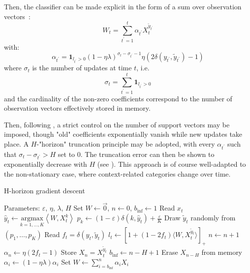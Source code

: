 \documentclass[preprint,12pt,authoryear]{elsarticle}
\begin{document}
Then, the classifier can be made explicit in the form of a sum over observation vectors~:
$$W_t = \sum_{t^\prime=1}^t \alpha_{t^\prime} X_t^{\tilde{y}_{t^\prime}}$$
with:
$$\alpha_{t^\prime} = \mathbf{1}_{l_{t^\prime} > 0}(1 - \eta \lambda)^{\sigma_t - \sigma_{t^\prime}-1}  \eta (2\delta(y_{t^\prime},\tilde{y}_{t^\prime})-1)$$
where $\sigma_t$ is the number of updates at time $t$, i.e.
$$\sigma_t = \sum_{t^\prime=1}^t \mathbf{1}_{l_{t^\prime} > 0}$$  
and the cardinality of the non-zero coefficients correspond to the number of observation vectors effectively stored in memory.

Then, following \cite{kivinen2004online}, a strict control on the number of support  vectors may be imposed, though "old" coefficients exponentially vanish while new updates take place. A $H$-"horizon" truncation principle may be adopted, with every $\alpha_{t^\prime}$ such that $\sigma_t - \sigma_{t^\prime} > H$ set to 0. The truncation error can then be shown to  exponentially decrease with $H$ (see \cite{kivinen2004online}). This approach is of course well-adapted to the non-stationary case, where context-related categories change over time.

\begin{algorithm}[t!]
	\caption{H-horizon gradient descent}
	\begin{algorithmic}
		
		\STATE Parameters:  $\varepsilon$, $\eta$, $\lambda$, $H$
		\STATE Set $W \leftarrow \vec{0}$, $n \leftarrow 0$, $b_\text{inf}\leftarrow 1$
		\STATE Read $x_t$
		\STATE $\hat{y}_t \leftarrow \underset{k = 1,\dots,K}{\text{argmax}}\left\langle W ,X_t^k\right\rangle$
		\STATE $p_{k}\leftarrow (1-\varepsilon)\delta(k,\hat{y}_t) + \frac{\varepsilon}{K}$
		\ENDFOR
		\STATE Draw $\tilde{y}_t$ randomly from $\left(p_{1},\dots ,p_{K}\right)$
		\STATE Read $f_t = \delta(y_t,\tilde{y}_t)$
		\STATE $l_t \leftarrow \left[ 1+(1-2f_t)\langle W,X_t^{\tilde{y}_t}\rangle\right]_{+}$ 
		\STATE $n \leftarrow n + 1$
		\STATE $\alpha_{n} \leftarrow \eta (2 f_t-1)$
		\STATE Store $X_{n} = X_t^{\tilde{y}_t}$
		\STATE $b_\text{inf} \leftarrow n - H + 1$
		\STATE Erase $X_{n - H }$ from memory
		\ENDIF 
		\STATE $\alpha_i \leftarrow (1 - \eta\lambda) \alpha_i$
		\ENDFOR			
		\STATE Set $W \leftarrow \sum_{i=b_\text{inf}}^n \alpha_i X_{i}$
		\ENDIF
		\ENDFOR
	\end{algorithmic}
\end{algorithm}
\end{document}
